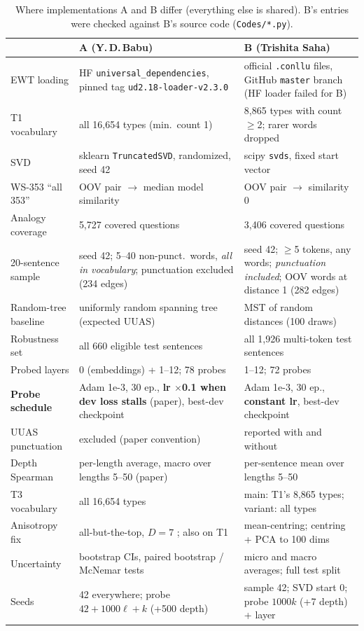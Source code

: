 \documentclass[11pt,a4paper]{article}
\newcommand{\TeammateName}{Trishita Saha}
\begin{document}
\begin{table}[h]\centering\footnotesize\setlength{\tabcolsep}{4pt}
\begin{tabular}{p{}p{}p{}}
\toprule
 & \textbf{A} (Y.\,D.\,Babu) & \textbf{B} (\TeammateName) \\
\midrule
EWT loading & HF \texttt{universal\_dependencies}, pinned tag \texttt{ud2.18-loader-v2.3.0} & official \texttt{.conllu} files, GitHub \texttt{master} branch (HF loader failed for B) \\
T1 vocabulary & all 16,654 types (min.\ count 1) & 8,865 types with count $\ge$2; rarer words dropped \\
SVD & sklearn \texttt{TruncatedSVD}, randomized, seed 42 & scipy \texttt{svds}, fixed start vector \\
WS-353 ``all 353'' & OOV pair $\to$ median model similarity & OOV pair $\to$ similarity 0 \\
Analogy coverage & 5,727 covered questions & 3,406 covered questions \\
20-sentence sample & seed 42; 5--40 non-punct.\ words, \emph{all in vocabulary}; punctuation excluded (234 edges) & seed 42; $\ge$5 tokens, any words; \emph{punctuation included}; OOV words at distance 1 (282 edges) \\
Random-tree baseline & uniformly random spanning tree (expected UUAS) & MST of random distances (100 draws) \\
Robustness set & all 660 eligible test sentences & all 1,926 multi-token test sentences \\
Probed layers & 0 (embeddings) + 1--12; 78 probes & 1--12; 72 probes \\
\textbf{Probe schedule} & Adam 1e-3, 30 ep., \textbf{lr $\times$0.1 when dev loss stalls} (paper), best-dev checkpoint & Adam 1e-3, 30 ep., \textbf{constant lr}, best-dev checkpoint \\
UUAS punctuation & excluded (paper convention) & reported with and without \\
Depth Spearman & per-length average, macro over lengths 5--50 (paper) & per-sentence mean over lengths 5--50 \\
T3 vocabulary & all 16,654 types & main: T1's 8,865 types; variant: all types \\
Anisotropy fix & all-but-the-top, $D=7$ \citep{mu}; also on T1 & mean-centring; centring + PCA to 100 dims \\
Uncertainty & bootstrap CIs, paired bootstrap / McNemar tests & micro and macro averages; full test split \\
Seeds & 42 everywhere; probe $42+1000\ell+k$ (+500 depth) & sample 42; SVD start 0; probe $1000k$ (+7 depth) + layer \\
\bottomrule
\end{tabular}
\caption{Where implementations A and B differ (everything else is shared). B's entries were checked against B's source code (\texttt{Codes/*.py}).}\label{tab:impl}\end{table}
\end{document}
